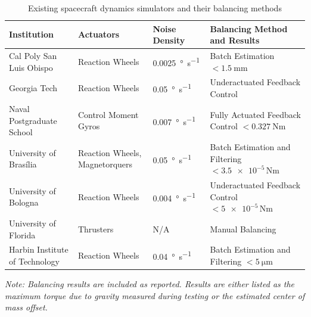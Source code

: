 \begin{table}[!ht]
\caption{Existing spacecraft dynamics simulators and their balancing methods}\label{table:existing_testbeds}
\centering
\renewcommand{\arraystretch}{1.3}

\begin{tabularx}{\textwidth}{
    >{\raggedright\arraybackslash}p{3cm}   %
    >{\raggedright\arraybackslash}p{3.5cm} %
    >{\raggedright\arraybackslash}p{2.2cm} %
    >{\raggedright\arraybackslash}X}       %
\toprule
\textbf{Institution} & \textbf{Actuators} & \textbf{Noise Density} & \textbf{Balancing Method and Results} \\
\midrule
Cal Poly San Luis Obispo~\cite{dam_applied_2014} & 
Reaction Wheels & 
\SI{0.0025}{\degree\per\second} & 
Batch Estimation \newline $<\SI{1.5}{\milli\metre}$ \\
\addlinespace[0.75em]

Georgia Tech~\cite{choi_automatic_2016} & 
Reaction Wheels & 
\SI{0.05}{\degree\per\second} & 
Underactuated Feedback Control \\
\addlinespace[0.75em]
Naval Postgraduate School~\cite{kim_system_2006} & 
Control Moment Gyros & 
\SI{0.007}{\degree\per\second} & 
Fully Actuated Feedback Control \newline $<\SI{0.327}{\newton\metre}$ \\
\addlinespace[0.75em]
University of Brasília~\cite{silva_filtering_2018} & 
Reaction Wheels, Magnetorquers & 
\SI{0.05}{\degree\per\second} & 
Batch Estimation and Filtering \newline $<\num{3.5e-5}\,\si{\newton\metre}$ \\
\addlinespace[0.75em]
University of Bologna~\cite{modenini2020dynamic} & 
Reaction Wheels & 
\SI{0.004}{\degree\per\second} & 
Underactuated Feedback Control \newline $<\num{5e-5}\,\si{\newton\metre}$ \\
\addlinespace[0.75em]
University of Florida~\cite{saulnier2014six} & 
Thrusters & 
N/A & 
Manual Balancing \\
\addlinespace[0.75em]
Harbin Institute of Technology~\cite{xu_parameter_2015} & 
Reaction Wheels & 
\SI{0.04}{\degree\per\second} & 
Batch Estimation and Filtering \newline $<\SI{5}{\micro\metre}$ \\


\bottomrule
\end{tabularx}

\vspace{0.5em}
\raggedright\footnotesize
\textit{Note: Balancing results are included as reported. Results are either listed as the maximum torque due to gravity measured during testing or the estimated center of mass offset.}
\end{table}

